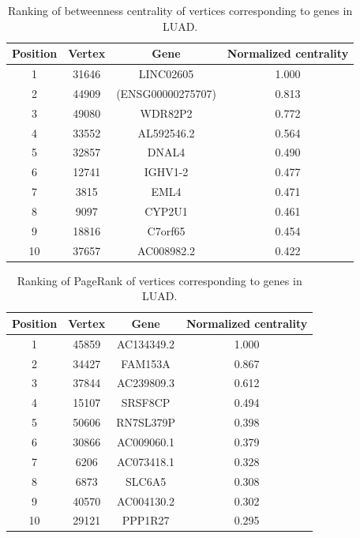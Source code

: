 \documentclass[12pt,a4paper]{report}
\begin{document}
\begin{table}[H]
\centering
\caption{Ranking of betweenness centrality of vertices corresponding to genes in LUAD.}
\label{tab:luad3}
\begin{tabular}{cccc}
\hline
\textbf{Position}         & \textbf{Vertex}     & \textbf{Gene}   & \textbf{Normalized centrality}   \\
\hline
   1       &    31646       &   LINC02605        &  1.000          \\
   2      &     44909      &    (ENSG00000275707)       &   0.813         \\
   3       &     49080      &     WDR82P2      &   0.772         \\
   4       &    33552       &   AL592546.2        &   0.564         \\
   5       &     32857      &    DNAL4       &   0.490         \\
   6       &     12741      &    IGHV1-2       &   0.477         \\
   7       &     3815      &     EML4      &    0.471        \\
   8       &     9097      &     CYP2U1      &   0.461         \\
   9       &     18816      &     C7orf65      &     0.454       \\
   10       &    37657       &     AC008982.2      &  0.422          \\
\hline
\end{tabular}
\end{table}

\begin{table}[H]
\centering
\caption{Ranking of PageRank of vertices corresponding to genes in LUAD.}
\label{tab:luad4}
\begin{tabular}{cccc}
\hline
\textbf{Position}         & \textbf{Vertex}     & \textbf{Gene}   & \textbf{Normalized centrality}   \\
\hline
   1       &    45859       &    AC134349.2       &  1.000          \\
   2      &   34427        & FAM153A          &0.867            \\
   3       &   37844        & AC239809.3          & 0.612           \\
   4       &    15107       &   SRSF8CP        &    0.494        \\
   5       &     50606      &    RN7SL379P       &   0.398         \\
   6       &    30866       &  AC009060.1         & 0.379           \\
   7       &  6206         &  AC073418.1         & 0.328           \\
   8       &   6873        &    SLC6A5       &   0.308         \\
   9       &    40570       &     AC004130.2      &           0.302 \\
   10       &    29121       &    PPP1R27       &  0.295          \\
\hline
\end{tabular}
\end{table}
\end{document}
